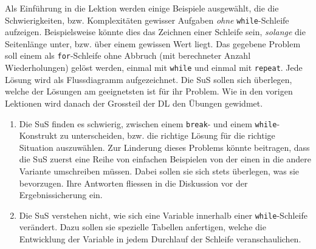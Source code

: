 \begin{myExBox}[title=DL \themycounter]
Als Einführung in die Lektion werden einige Beispiele ausgewählt, die die Schwierigkeiten, bzw. Komplexitäten gewisser Aufgaben \textit{ohne} \lstinline|while|-Schleife aufzeigen. Beispielsweise könnte dies das Zeichnen einer Schleife sein, \textit{solange} die Seitenlänge unter, bzw. über einem gewissen Wert liegt. Das gegebene Problem soll einem als \lstinline|for|-Schleife ohne Abbruch (mit berechneter Anzahl Wiederholungen) gelöst werden, einmal mit \lstinline|while| und einmal mit \lstinline|repeat|. Jede Lösung wird als Flussdiagramm aufgezeichnet. Die SuS sollen sich überlegen, welche der Lösungen am geeignetsten ist für ihr Problem. Wie in den vorigen Lektionen wird danach der Grossteil der DL den Übungen gewidmet.

\begin{myExBox}[title=Mögliche Schwierigkeiten \& geeignete Massnahmen]
\begin{enumerate}
    \item Die SuS finden es schwierig, zwischen einem \lstinline|break|- und einem \lstinline|while|-Konstrukt zu unterscheiden, bzw. die richtige Lösung für die richtige Situation auszuwählen. Zur Linderung dieses Problems könnte beitragen, dass die SuS zuerst eine Reihe von einfachen Beispielen von der einen in die andere Variante umschreiben müssen. Dabei sollen sie sich stets überlegen, was sie bevorzugen. Ihre Antworten fliessen in die Diskussion vor der Ergebnissicherung ein.
    \item Die SuS verstehen nicht, wie sich eine Variable innerhalb einer \lstinline|while|-Schleife verändert. Dazu sollen sie spezielle Tabellen anfertigen, welche die Entwicklung der Variable in jedem Durchlauf der Schleife veranschaulichen.
\end{enumerate}
\end{myExBox}
\end{myExBox}
\newpage{}

